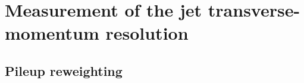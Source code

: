 \FloatBarrier
\chapter{\texorpdfstring{Measurement of the jet transverse-momentum resolution}{Appendix B: \quad Measurement of the jet transverse-momentum resolution}}
\section{Pileup reweighting}
\label{res:app:pileup}

